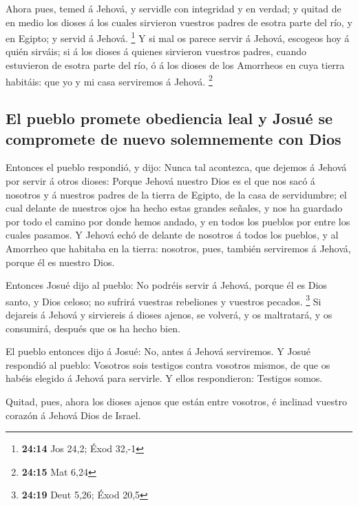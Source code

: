  Ahora pues, temed á Jehová, y servidle con integridad y en
verdad; y quitad de en medio los dioses á los cuales sirvieron vuestros
padres de esotra parte del río, y en Egipto; y servid á Jehová.
\footnote{\textbf{24:14} Jos 24,2; Éxod 32,-1}  Y si mal os
parece servir á Jehová, escogeos hoy á quién sirváis; si á los dioses á
quienes sirvieron vuestros padres, cuando estuvieron de esotra parte del
río, ó á los dioses de los Amorrheos en cuya tierra habitáis: que yo y
mi casa serviremos á Jehová. \footnote{\textbf{24:15} Mat 6,24}

\hypertarget{el-pueblo-promete-obediencia-leal-y-josuuxe9-se-compromete-de-nuevo-solemnemente-con-dios}{%
\subsection{El pueblo promete obediencia leal y Josué se compromete de
nuevo solemnemente con
Dios}\label{el-pueblo-promete-obediencia-leal-y-josuuxe9-se-compromete-de-nuevo-solemnemente-con-dios}}

 Entonces el pueblo respondió, y dijo: Nunca tal acontezca,
que dejemos á Jehová por servir á otros dioses:  Porque
Jehová nuestro Dios es el que nos sacó á nosotros y á nuestros padres de
la tierra de Egipto, de la casa de servidumbre; el cual delante de
nuestros ojos ha hecho estas grandes señales, y nos ha guardado por todo
el camino por donde hemos andado, y en todos los pueblos por entre los
cuales pasamos.  Y Jehová echó de delante de nosotros á
todos los pueblos, y al Amorrheo que habitaba en la tierra: nosotros,
pues, también serviremos á Jehová, porque él es nuestro Dios.

 Entonces Josué dijo al pueblo: No podréis servir á Jehová,
porque él es Dios santo, y Dios celoso; no sufrirá vuestras rebeliones y
vuestros pecados. \footnote{\textbf{24:19} Deut 5,26; Éxod 20,5}
 Si dejareis á Jehová y sirviereis á dioses ajenos, se
volverá, y os maltratará, y os consumirá, después que os ha hecho bien.

 El pueblo entonces dijo á Josué: No, antes á Jehová
serviremos.  Y Josué respondió al pueblo: Vosotros sois
testigos contra vosotros mismos, de que os habéis elegido á Jehová para
servirle. Y ellos respondieron: Testigos somos.

 Quitad, pues, ahora los dioses ajenos que están entre
vosotros, é inclinad vuestro corazón á Jehová Dios de Israel.

